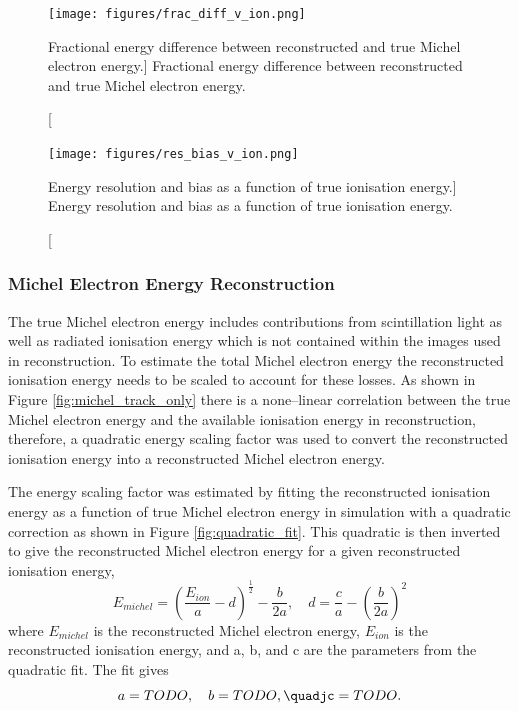 
\begin{figure}
	\centering
	\texttt{[image: figures/frac\_diff\_v\_ion.png]}
	\caption
	[Fractional energy difference between reconstructed and true Michel electron
	energy.]
	{Fractional energy difference between reconstructed and true Michel electron
	energy.}
	\label{fig:frac_diff_ion}
\end{figure}

\begin{figure}
	\centering
	\texttt{[image: figures/res\_bias\_v\_ion.png]}
	\caption
	[Energy resolution and bias as a function of true ionisation energy.]
	{Energy resolution and bias as a function of true ionisation energy.}
	\label{fig:res_and_bias_ion}
\end{figure}


\subsubsection{Michel Electron Energy Reconstruction}

The true Michel electron energy includes contributions from scintillation light
as well as radiated ionisation energy which is not contained within the images
used in reconstruction. To estimate the total Michel electron energy the
reconstructed ionisation energy needs to be scaled to account for these losses.
As shown in Figure \ref{fig:michel_track_only} there is a none--linear
correlation between the true Michel electron energy and the available ionisation
energy in reconstruction, therefore, a quadratic energy scaling factor was used
to convert the reconstructed ionisation energy into a reconstructed Michel
electron energy. 

The energy scaling factor was estimated by fitting the reconstructed ionisation
energy as a function of true Michel electron energy in \protodune{} simulation
with a quadratic correction as shown in Figure \ref{fig:quadratic_fit}. This 
quadratic is then inverted to give the reconstructed Michel electron energy for 
a given reconstructed ionisation energy, 
\begin{equation}
	E_{michel} = \left( \frac{E_{ion}}{a} - d \right)^{\frac{1}{2}} - \frac{b}{2a},
	\quad d = \frac{c}{a} - \left( \frac{b}{2a} \right)^2 
\end{equation}
where $E_{michel}$ is the reconstructed Michel electron energy, $E_{ion}$ is the
reconstructed ionisation energy, and a, b, and c are the parameters from the
quadratic fit. The fit gives
\begin{equation}
	a = TODO, \quad b = TODO, \quadjc = TODO.
\end{equation}

